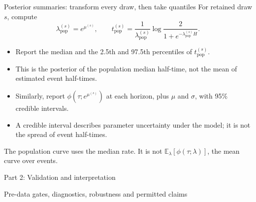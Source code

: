 \documentclass[aspectratio=169,11pt]{beamer}
\newcommand{\source}[1]{\par\vfill{\scriptsize\color{muted}#1}\par}
\begin{document}
\begin{frame}{Posterior summaries: transform every draw, then take quantiles}
For retained draw $s$, compute
\[\lambda_{\mathrm{pop}}^{(s)}=e^{\mu^{(s)}},\qquad
t_{\mathrm{pop}}^{(s)}=\frac1{\lambda_{\mathrm{pop}}^{(s)}}
\log\frac2{1+e^{-\lambda_{\mathrm{pop}}^{(s)}H}}.\]
\begin{itemize}
\item Report the median and the 2.5th and 97.5th percentiles of $t_{\mathrm{pop}}^{(s)}$.
\item This is the posterior of the population median half-time, not the mean of estimated event half-times.
\item Similarly, report $\phi(\tau;e^{\mu^{(s)}})$ at each horizon, plus $\mu$ and $\sigma$, with 95\% credible intervals.
\item A credible interval describes parameter uncertainty under the model; it is not the spread of event half-times.
\end{itemize}
\source{The population curve uses the median rate. It is not $\mathbb E_{\lambda}[\phi(\tau;\lambda)]$, the mean curve over events.}
\end{frame}

{
\begin{frame}[plain]
\vspace{1cm}{\color{accent}\rule{1.4cm}{2pt}}\par\vspace{0.6cm}
{\huge Part 2: Validation and interpretation}\par\vspace{0.6cm}
Pre-data gates, diagnostics, robustness and permitted claims
\end{frame}}
\end{document}
